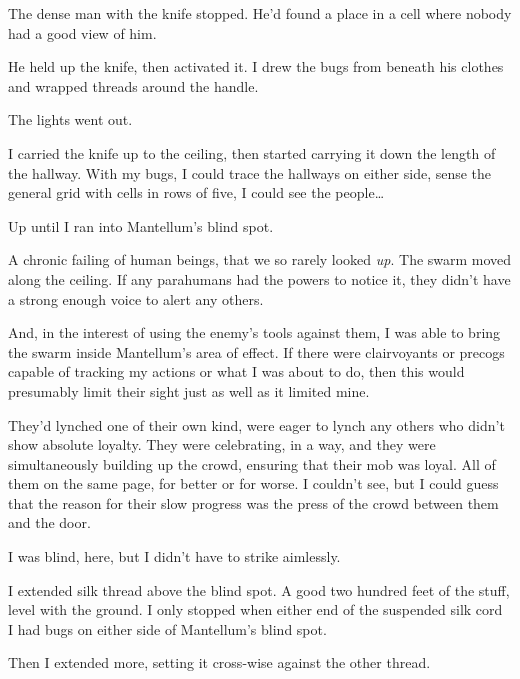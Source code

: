The dense man with the knife stopped.  He'd found a place in a cell where nobody had a good view of him.



He held up the knife, then activated it.   I drew the bugs from beneath his clothes and wrapped threads around the handle.



The lights went out.



I carried the knife up to the ceiling, then started carrying it down the length of the hallway.  With my bugs, I could trace the hallways on either side, sense the general grid with cells in rows of five, I could see the people\ldots



Up until I ran into Mantellum's blind spot.



A chronic failing of human beings, that we so rarely looked \emph{up}.  The swarm moved along the ceiling.  If any parahumans had the powers to notice it, they didn't have a strong enough voice to alert any others.



And, in the interest of using the enemy's tools against them, I was able to bring the swarm inside Mantellum's area of effect.  If there were clairvoyants or precogs capable of tracking my actions or what I was about to do, then this would presumably limit their sight just as well as it limited mine.



They'd lynched one of their own kind, were eager to lynch any others who didn't show absolute loyalty.  They were celebrating, in a way, and they were simultaneously building up the crowd, ensuring that their mob was loyal.  All of them on the same page, for better or for worse.  I couldn't see, but I could guess that the reason for their slow progress was the press of the crowd between them and the door.



I was blind, here, but I didn't have to strike aimlessly.



I extended silk thread above the blind spot.  A good two hundred feet of the stuff, level with the ground.  I only stopped when either end of the suspended silk cord I had bugs on either side of Mantellum's blind spot.



Then I extended more, setting it cross-wise against the other thread.



